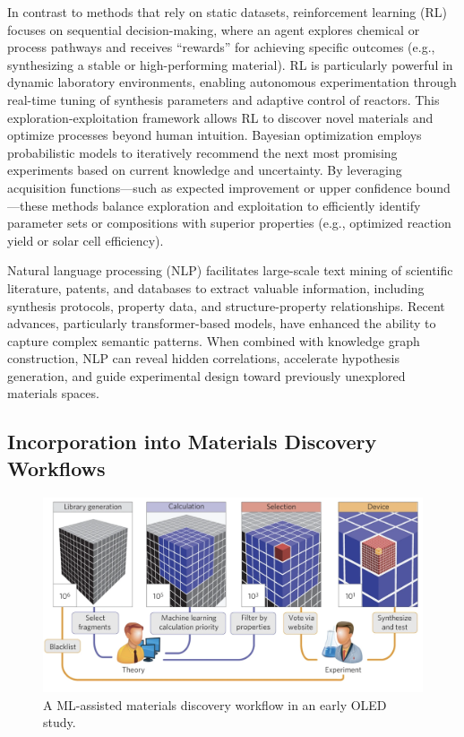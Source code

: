 In contrast to methods that rely on static datasets, reinforcement learning (RL) focuses on sequential decision-making, where an agent explores chemical or process pathways and receives “rewards” for achieving specific outcomes (e.g., synthesizing a stable or high-performing material). RL is particularly powerful in dynamic laboratory environments, enabling autonomous experimentation through real-time tuning of synthesis parameters and adaptive control of reactors. This exploration-exploitation framework allows RL to discover novel materials and optimize processes beyond human intuition\cite{RN604,RN339}.
Bayesian optimization employs probabilistic models to iteratively recommend the next most promising experiments based on current knowledge and uncertainty. By leveraging acquisition functions—such as expected improvement or upper confidence bound—these methods balance exploration and exploitation to efficiently identify parameter sets or compositions with superior properties (e.g., optimized reaction yield or solar cell efficiency)\cite{RN549,RN362,RN612}.

Natural language processing (NLP) facilitates large-scale text mining of scientific literature, patents, and databases to extract valuable information, including synthesis protocols, property data, and structure-property relationships. Recent advances, particularly transformer-based models, have enhanced the ability to capture complex semantic patterns. When combined with knowledge graph construction, NLP can reveal hidden correlations, accelerate hypothesis generation, and guide experimental design toward previously unexplored materials spaces\cite{RN604,RN635,RN634,RN636}.

\subsection{Incorporation into Materials Discovery Workflows}

\begin{figure}[ht]
    \centering
    \includegraphics[width=\textwidth]{figures/literature-review/figure2-3.png}
    \caption{A ML-assisted materials discovery workflow in an early OLED study\cite{RN66}.}
    \label{fig:figure2.3}
\end{figure}

